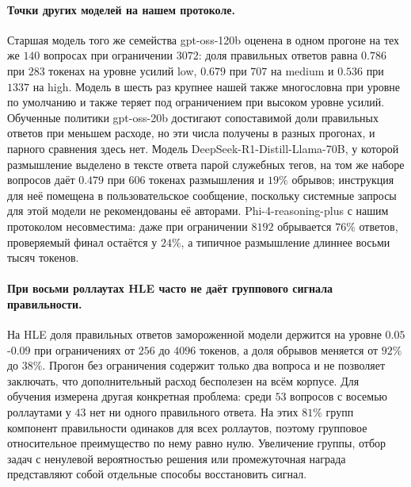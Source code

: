 \documentclass[11pt]{article}
\begin{document}
\paragraph{Точки других моделей на нашем протоколе.} Старшая модель того же семейства gpt-oss-120b оценена в одном прогоне на тех же $140$ вопросах при ограничении $3072$: доля правильных ответов равна $0.786$ при $283$ токенах на уровне усилий low, $0.679$ при $707$ на medium и $0.536$ при $1337$ на high. Модель в шесть раз крупнее нашей также многословна при уровне по умолчанию и также теряет под ограничением при высоком уровне усилий. Обученные политики gpt-oss-20b достигают сопоставимой доли правильных ответов при меньшем расходе, но эти числа получены в разных прогонах, и парного сравнения здесь нет. Модель DeepSeek-R1-Distill-Llama-70B, у которой размышление выделено в тексте ответа парой служебных тегов, на том же наборе вопросов даёт $0.479$ при $606$ токенах размышления и $19\%$ обрывов; инструкция для неё помещена в пользовательское сообщение, поскольку системные запросы для этой модели не рекомендованы её авторами. Phi-4-reasoning-plus с нашим протоколом несовместима: даже при ограничении $8192$ обрывается $76\%$ ответов, проверяемый финал остаётся у $24\%$, а типичное размышление длиннее восьми тысяч токенов.

\paragraph{При восьми роллаутах HLE часто не даёт группового сигнала правильности.} На HLE доля правильных ответов замороженной модели держится на уровне $0.05$-$0.09$ при ограничениях от $256$ до $4096$ токенов, а доля обрывов меняется от $92\%$ до $38\%$. Прогон без ограничения содержит только два вопроса и не позволяет заключать, что дополнительный расход бесполезен на всём корпусе. Для обучения измерена другая конкретная проблема: среди $53$ вопросов с восемью роллаутами у $43$ нет ни одного правильного ответа. На этих $81\%$ групп компонент правильности одинаков для всех роллаутов, поэтому групповое относительное преимущество по нему равно нулю. Увеличение группы, отбор задач с ненулевой вероятностью решения или промежуточная награда представляют собой отдельные способы восстановить сигнал.
\end{document}
